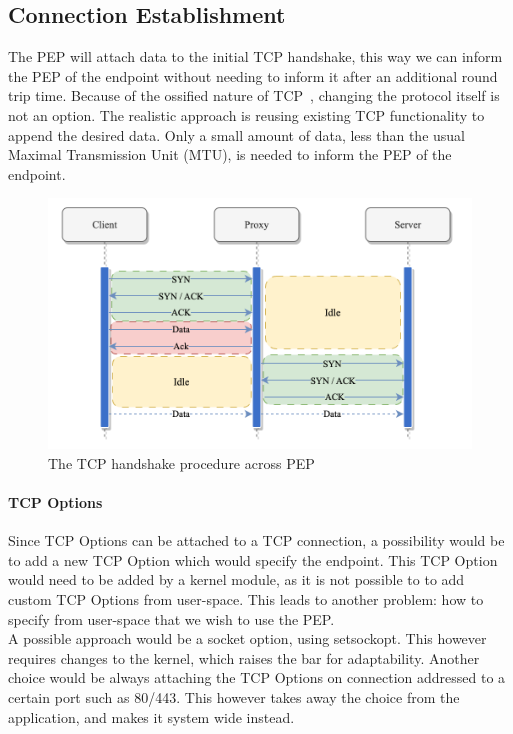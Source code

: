 \documentclass[a4paper,english, 11pt]{report}
\begin{document}
\subsection{Connection Establishment}  
The PEP will attach data to the initial TCP handshake, this way we can inform the PEP of the endpoint without needing to inform it after an additional round trip time. Because of the ossified nature of TCP~\cite{tcp_extendable}, changing the protocol itself is not an option. The realistic approach is reusing existing TCP functionality to append the desired data. Only a small amount of data, less than the usual Maximal Transmission Unit (MTU), is needed to inform the PEP of the endpoint. \\

\begin{figure} %
	\centering
	\includegraphics[scale=0.75]{../diagrams/drawio/tcphandshake_primitiv.png}
  	\caption{The TCP handshake procedure across PEP}
  	\label{fig:tcphandshake_primitiv}
\end{figure}

\paragraph{TCP Options}
Since TCP Options can be attached to a TCP connection, a possibility would be to add a new TCP Option which would specify the endpoint. This TCP Option would need to be added by a kernel module, as it is not possible to to add custom TCP Options from user-space. This leads to another problem: how to specify from user-space that we wish to use the PEP.\\

A possible approach would be a socket option, using setsockopt. This however requires changes to the kernel, which raises the bar for adaptability. Another choice would be always attaching the TCP Options on connection addressed to a certain port such as 80/443. This however takes away the choice from the application, and makes it system wide instead.\\
\end{document}
